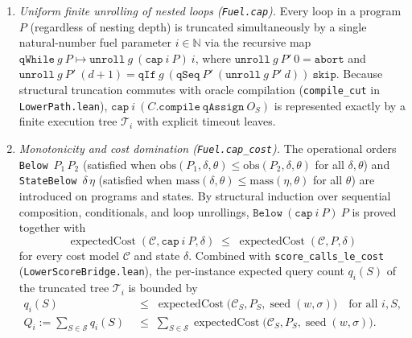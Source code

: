 \documentclass[11pt,a4paper]{article}
\theoremstyle{definition}
\theoremstyle{remark}
\begin{document}
\begin{enumerate}
\item \emph{Uniform finite unrolling of nested loops (\texttt{Fuel.cap}).} Every loop in a program \(P\) (regardless of nesting depth) is truncated simultaneously by a single natural-number fuel parameter \(i \in \mathbb{N}\) via the recursive map \(\texttt{qWhile}\ g\ P \mapsto \texttt{unroll}\ g\ (\texttt{cap}\ i\ P)\ i\), where \(\texttt{unroll}\ g\ P'\ 0 = \texttt{abort}\) and \(\texttt{unroll}\ g\ P'\ (d+1) = \texttt{qIf}\ g\ (\texttt{qSeq}\ P'\ (\texttt{unroll}\ g\ P'\ d))\ \texttt{skip}\). Because structural truncation commutes with oracle compilation (\texttt{compile\_cut} in \texttt{LowerPath.lean}), \(\texttt{cap}\ i\ (C.\texttt{compile}\ \texttt{qAssign}\ O_S)\) is represented exactly by a finite execution tree \(\mathcal{T}_i\) with explicit timeout leaves.
\item \emph{Monotonicity and cost domination (\texttt{Fuel.cap\_cost}).} The operational orders \texttt{Below}~\(P_1\,P_2\) (satisfied when \(\mathrm{obs}(P_1,\delta,\theta) \le \mathrm{obs}(P_2,\delta,\theta)\) for all \(\delta, \theta\)) and \texttt{StateBelow}~\(\delta\,\eta\) (satisfied when \(\mathrm{mass}(\delta,\theta) \le \mathrm{mass}(\eta,\theta)\) for all \(\theta\)) are introduced on programs and states. By structural induction over sequential composition, conditionals, and loop unrollings, \(\texttt{Below}\ (\texttt{cap}\ i\ P)\ P\) is proved together with
\[
  \operatorname{expectedCost}(\mathcal{C}, \texttt{cap}\ i\ P, \delta) \;\le\; \operatorname{expectedCost}(\mathcal{C}, P, \delta)
\]
for every cost model \(\mathcal{C}\) and state \(\delta\). Combined with \texttt{score\_\allowbreak calls\_\allowbreak le\_\allowbreak cost} (\texttt{Lower\allowbreak Score\allowbreak Bridge.lean}), the per-instance expected query count \(q_i(S)\) of the truncated tree \(\mathcal{T}_i\) is bounded by
\[
  \begin{aligned}
  q_i(S) &\;\le\; \operatorname{expectedCost}\bigl(\mathcal{C}_S, P_S, \operatorname{seed}(w,\sigma)\bigr)
  \quad\text{for all } i, S, \\
  Q_i := \sum_{S \in \mathcal{S}} q_i(S)
  &\;\le\; \sum_{S \in \mathcal{S}} \operatorname{expectedCost}\bigl(\mathcal{C}_S, P_S, \operatorname{seed}(w,\sigma)\bigr).
  \end{aligned}
\]

\end{enumerate}
\end{document}
